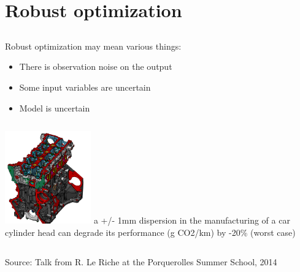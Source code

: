 \documentclass{beamer}
\begin{document}
\section[Robust optim.]{Robust optimization}
\subsection{}

\begin{frame}{}
Robust optimization may mean various things:
\begin{itemize}
	\item There is observation noise on the output
	\item Some input variables are uncertain
	\item Model is uncertain
\end{itemize}
\vspace{2mm}
\begin{example}
\begin{columns}[c]
\column{3cm}
	\includegraphics[height=4cm]{figures/RLRrobust}
\column{5cm}
	a +/- 1mm dispersion in the manufacturing of a car cylinder head  can degrade its performance (g CO2/km) by -20\% (worst case)\\
\end{columns}
\vspace{3mm}
	\small Source: Talk from R. Le Riche at the Porquerolles Summer School, 2014
\end{example}
\end{frame}
\end{document}
